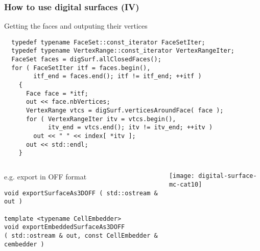 \documentclass[pdftex,francais]{beamer}
\begin{document}
\begin{frame}[fragile]%
  \frametitle{How to use digital surfaces (IV)}

  Getting the faces and outputing their vertices


  \begin{lstlisting}
  typedef typename FaceSet::const_iterator FaceSetIter;
  typedef typename VertexRange::const_iterator VertexRangeIter;
  FaceSet faces = digSurf.allClosedFaces();
  for ( FaceSetIter itf = faces.begin(), 
        itf_end = faces.end(); itf != itf_end; ++itf )
    {
      Face face = *itf;
      out << face.nbVertices;
      VertexRange vtcs = digSurf.verticesAroundFace( face );
      for ( VertexRangeIter itv = vtcs.begin(), 
            itv_end = vtcs.end(); itv != itv_end; ++itv )
        out << " " << index[ *itv ];
      out << std::endl;
    }
  \end{lstlisting}

  \begin{columns}
    \begin{column}{0.63\textwidth}
      e.g. export in OFF format
   \begin{lstlisting}
void exportSurfaceAs3DOFF ( std::ostream & out )

template <typename CellEmbedder>
void exportEmbeddedSurfaceAs3DOFF
( std::ostream & out, const CellEmbedder & cembedder ) 
   \end{lstlisting}
    \end{column}
    \begin{column}{0.3\textwidth}
      \texttt{[image: digital-surface-mc-cat10]}
    \end{column}
  \end{columns}

\end{frame}


\end{document}
